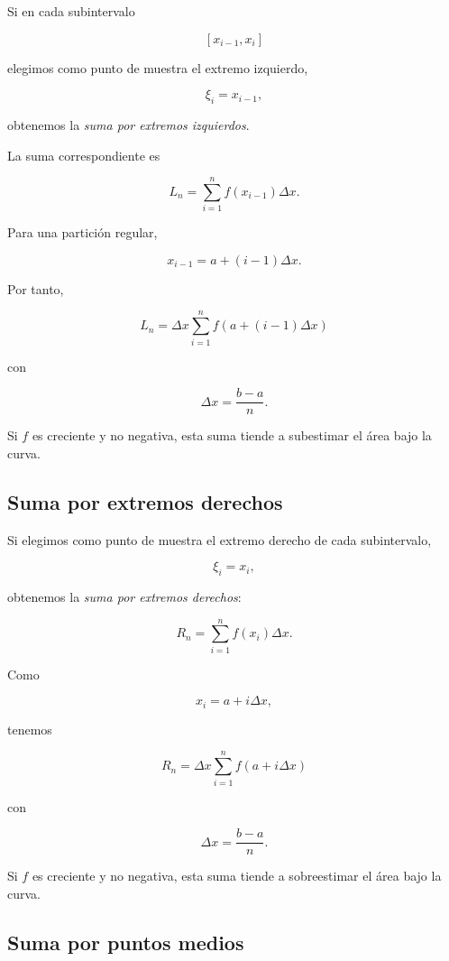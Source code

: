 \documentclass[12pt]{article}
\begin{document}
Si en cada subintervalo

\[
[x_{i-1},x_i]
\]

elegimos como punto de muestra el extremo izquierdo,

\[
\xi_i=x_{i-1},
\]

obtenemos la \emph{suma por extremos izquierdos}.

La suma correspondiente es

\[
L_n
=
\sum_{i=1}^{n}
f(x_{i-1})\Delta x.
\]

Para una partición regular,

\[
x_{i-1}
=
a+(i-1)\Delta x.
\]

Por tanto,

\[
\boxed{
L_n
=
\Delta x
\sum_{i=1}^{n}
f\left(a+(i-1)\Delta x\right)
}
\]

con

\[
\Delta x=\frac{b-a}{n}.
\]

Si $f$ es creciente y no negativa, esta suma tiende a subestimar el área
bajo la curva.

\subsection{Suma por extremos derechos}

Si elegimos como punto de muestra el extremo derecho de cada subintervalo,

\[
\xi_i=x_i,
\]

obtenemos la \emph{suma por extremos derechos}:

\[
R_n
=
\sum_{i=1}^{n}
f(x_i)\Delta x.
\]

Como

\[
x_i=a+i\Delta x,
\]

tenemos

\[
\boxed{
R_n
=
\Delta x
\sum_{i=1}^{n}
f\left(a+i\Delta x\right)
}
\]

con

\[
\Delta x=\frac{b-a}{n}.
\]

Si $f$ es creciente y no negativa, esta suma tiende a sobreestimar el área
bajo la curva.

\subsection{Suma por puntos medios}
\end{document}
